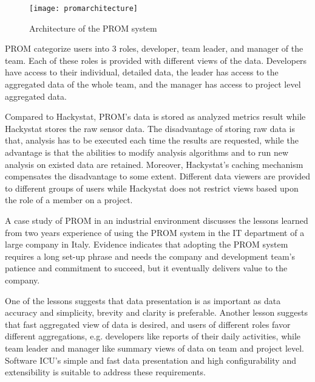 \begin{figure}[htbp]
     \centering
     \texttt{[image: promarchitecture]}
     \caption{Architecture of the PROM system}
     \label{fig:promarchitecture}
\end{figure}

PROM categorize users into 3 roles, developer, team leader, and manager of the team. Each of these roles is provided with different views of the data. Developers have access to their individual, detailed data, the leader has access to the aggregated data of the whole team, and the manager has access to project level aggregated data.

Compared to Hackystat, PROM's data is stored as analyzed metrics result while Hackystat stores the raw sensor data. The disadvantage of storing raw data is that, analysis has to be executed each time the results are requested, while the advantage is that the abilities to modify analysis algorithms and to run new analysis on existed data are retained. Moreover, Hackystat's caching mechanism compensates the disadvantage to some extent. Different data viewers are provided to different groups of users while Hackystat does not restrict views based upon the role of a member on a project.

A case study of PROM in an industrial environment\cite{prom09} discusses the lessons learned from two years experience of using the PROM system in the IT department of a large company in Italy. Evidence indicates that adopting the PROM system requires a long set-up phrase and needs the company and development team's patience and commitment to succeed, but it eventually delivers value to the company. 

One of the lessons suggests that data presentation is as important as data accuracy and simplicity, brevity and clarity is preferable. Another lesson suggests that fast aggregated view of data is desired, and users of different roles favor different aggregations, e.g. developers like reports of their daily activities, while team leader and manager like summary views of data on team and project level. Software ICU's simple and fast data presentation and high configurability and extensibility is suitable to address these requirements.



